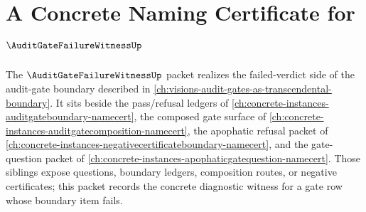 \chapter{A Concrete Naming Certificate for $\AuditGateFailureWitnessUp$}
\label{ch:concrete-instances-auditgatefailurewitness-namecert}

The $\AuditGateFailureWitnessUp$ packet realizes the failed-verdict side of the audit-gate boundary described in \autoref{ch:visions-audit-gates-as-transcendental-boundary}. It sits beside the pass/refusal ledgers of \autoref{ch:concrete-instances-auditgateboundary-namecert}, the composed gate surface of \autoref{ch:concrete-instances-auditgatecomposition-namecert}, the apophatic refusal packet of \autoref{ch:concrete-instances-negativecertificateboundary-namecert}, and the gate-question packet of \autoref{ch:concrete-instances-apophaticgatequestion-namecert}. Those siblings expose questions, boundary ledgers, composition routes, or negative certificates; this packet records the concrete diagnostic witness for a gate row whose boundary item fails.



